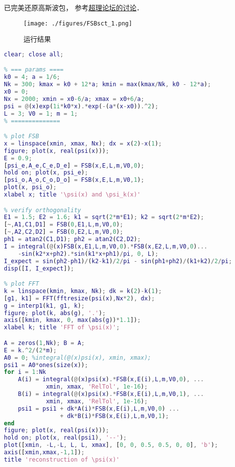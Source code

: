 
\begin{issues}
\issueDraft
{}
\end{issues}

已完美还原高斯波包， 参考\href{https://chaoli.club/index.php/4541/}{超理论坛的讨论}．

\begin{figure}[ht]
\centering
\texttt{[image: ./figures/FSBsct\_1.png]}
\caption{运行结果} \label{FSBsct_fig1}
\end{figure}

\begin{lstlisting}[language=matlab, caption=FSBsct.m]
clear; close all;

% === params ====
k0 = 4; a = 1/6;
Nk = 300; kmax = k0 + 12*a; kmin = max(kmax/Nk, k0 - 12*a);
x0 = 0;
Nx = 2000; xmin = x0-6/a; xmax = x0+6/a;
psi = @(x)exp(1i*k0*x).*exp(-(a*(x-x0)).^2);
L = 3; V0 = 1; m = 1;
% ==============

% plot FSB
x = linspace(xmin, xmax, Nx); dx = x(2)-x(1);
figure; plot(x, real(psi(x)));
E = 0.9;
[psi_e,A_e,C_e,D_e] = FSB(x,E,L,m,V0,0);
hold on; plot(x, psi_e);
[psi_o,A_o,C_o,D_o] = FSB(x,E,L,m,V0,1);
plot(x, psi_o);
xlabel x; title '\psi(x) and \psi_k(x)'

% verify orthogonality
E1 = 1.5; E2 = 1.6; k1 = sqrt(2*m*E1); k2 = sqrt(2*m*E2);
[~,A1,C1,D1] = FSB(0,E1,L,m,V0,0);
[~,A2,C2,D2] = FSB(0,E2,L,m,V0,0);
ph1 = atan2(C1,D1); ph2 = atan2(C2,D2);
I = integral(@(x)FSB(x,E1,L,m,V0,0).*FSB(x,E2,L,m,V0,0)...
    -sin(k2*x+ph2).*sin(k1*x+ph1)/pi, 0, L);
I_expect = sin(ph2-ph1)/(k2-k1)/2/pi - sin(ph1+ph2)/(k1+k2)/2/pi;
disp([I, I_expect]);

% plot FFT
k = linspace(kmin, kmax, Nk); dk = k(2)-k(1);
[g1, k1] = FFT(fftresize(psi(x),Nx*2), dx);
g = interp1(k1, g1, k);
figure; plot(k, abs(g), '.');
axis([kmin, kmax, 0, max(abs(g))*1.1]);
xlabel k; title 'FFT of \psi(x)';

A = zeros(1,Nk); B = A;
E = k.^2/(2*m);
A0 = 0; %integral(@(x)psi(x), xmin, xmax);
psi1 = A0*ones(size(x));
for i = 1:Nk
    A(i) = integral(@(x)psi(x).*FSB(x,E(i),L,m,V0,0), ...
            xmin, xmax, 'RelTol', 1e-16);
    B(i) = integral(@(x)psi(x).*FSB(x,E(i),L,m,V0,1), ...
            xmin, xmax, 'RelTol', 1e-16);
    psi1 = psi1 + dk*A(i)*FSB(x,E(i),L,m,V0,0) ...
                + dk*B(i)*FSB(x,E(i),L,m,V0,1);
end
figure; plot(x, real(psi(x)));
hold on; plot(x, real(psi1), '--');
plot([xmin, -L,-L, L, L, xmax], [0, 0, 0.5, 0.5, 0, 0], 'b');
axis([xmin,xmax,-1,1]);
title 'reconstruction of \psi(x)'
\end{lstlisting}
